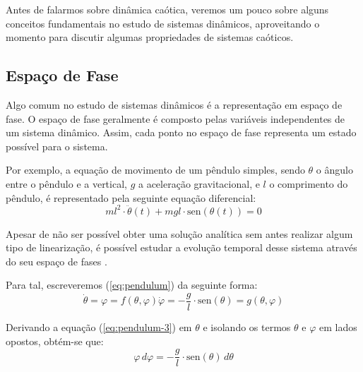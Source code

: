 \documentclass[a4paper, 12pt]{article}
\newcommand{\sen}{\text{sen}}
\begin{document}
Antes de falarmos sobre dinâmica caótica, veremos um pouco sobre alguns conceitos fundamentais no estudo de sistemas dinâmicos, aproveitando o momento para discutir algumas propriedades de sistemas caóticos.

\subsection{Espaço de Fase}
Algo comum no estudo de sistemas dinâmicos é a representação em espaço de fase. O espaço de fase geralmente é composto pelas variáveis independentes de um sistema dinâmico. Assim, cada ponto no espaço de fase representa um estado possível para o sistema.

Por exemplo, a equação de movimento de um pêndulo simples, sendo $\theta$ o ângulo entre o pêndulo e a vertical, $g$ a aceleração gravitacional, e $l$ o comprimento do pêndulo, é representado pela seguinte equação diferencial:
\begin{equation}\label{eq:pendulum}
m l^2 \cdot \ddot{\theta}(t) + mgl\cdot  \sen(\theta(t)) = 0
\end{equation}

Apesar de não ser possível obter uma solução analítica sem antes realizar algum tipo de linearização, é possível estudar a evolução temporal desse sistema através do seu espaço de fases \cite{fiedler1994caos}.

Para tal, escreveremos (\ref{eq:pendulum}) da seguinte forma:
\begin{subequations}
\begin{equation}\label{eq:pendulum-2}
\dot{\theta} = \varphi = f(\theta, \varphi)
\end{equation}
\begin{equation}\label{eq:pendulum-3}
\dot{\varphi} = -\frac{g}{l} \cdot \sen(\theta) = g(\theta, \varphi)
\end{equation}
\end{subequations}

Derivando a equação (\ref{eq:pendulum-3}) em $\theta$ e isolando os termos $\theta$ e $\varphi$ em lados opostos, obtém-se que:
\begin{equation}\label{eq:pendulum-4}
\varphi \, d\varphi = -\frac{g}{l} \cdot \sen(\theta) \, d\theta
\end{equation}
\end{document}
